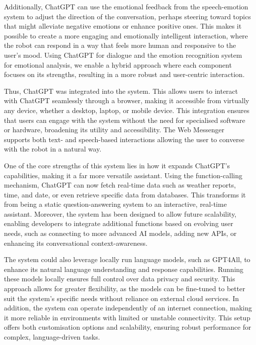 Additionally, ChatGPT can use the emotional feedback from the speech-emotion system to adjust the direction of the conversation, perhaps steering toward topics that might alleviate negative emotions or enhance positive ones. This makes it possible to create a more engaging and emotionally intelligent interaction, where the robot can respond in a way that feels more human and responsive to the user's mood. Using ChatGPT for dialogue and the emotion recognition system for emotional analysis, we enable a hybrid approach where each component focuses on its strengths, resulting in a more robust and user-centric interaction.

Thus, ChatGPT was integrated into the system. This allows users to interact with ChatGPT seamlessly through a browser, making it accessible from virtually any device, whether a desktop, laptop, or mobile device. This integration ensures that users can engage with the system without the need for specialised software or hardware, broadening its utility and accessibility. The Web Messenger supports both text- and speech-based interactions allowing the user to converse with the robot in a natural way.

One of the core strengths of this system lies in how it expands ChatGPT's capabilities, making it a far more versatile assistant. Using the function-calling mechanism, ChatGPT can now fetch real-time data such as weather reports, time, and date, or even retrieve specific data from databases. This transforms it from being a static question-answering system to an interactive, real-time assistant. Moreover, the system has been designed to allow future scalability, enabling developers to integrate additional functions based on evolving user needs, such as connecting to more advanced AI models, adding new APIs, or enhancing its conversational context-awareness.

The system could also leverage locally run language models, such as GPT4All, to enhance its natural language understanding and response capabilities. Running these models locally ensures full control over data privacy and security. This approach allows for greater flexibility, as the models can be fine-tuned to better suit the system's specific needs without reliance on external cloud services. In addition, the system can operate independently of an internet connection, making it more reliable in environments with limited or unstable connectivity. This setup offers both customisation options and scalability, ensuring robust performance for complex, language-driven tasks.

